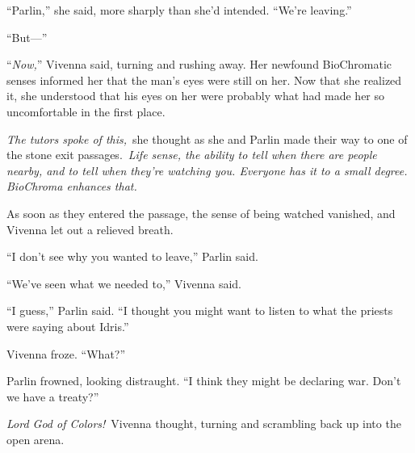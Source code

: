 “Parlin,” she said, more sharply than she’d intended. “We’re leaving.”

“But—”

“\textit{Now,}” Vivenna said, turning and rushing away. Her newfound BioChromatic senses informed her that the man’s eyes were still on her. Now that she realized it, she understood that his eyes on her were probably what had made her so uncomfortable in the first place.

\textit{The tutors spoke of this,}~she thought as she and Parlin made their way to one of the stone exit passages.~\textit{Life sense, the ability to tell when there are people nearby, and to tell when they’re watching you. Everyone has it to a small degree. BioChroma enhances that.}

As soon as they entered the passage, the sense of being watched vanished, and Vivenna let out a relieved breath.

“I don’t see why you wanted to leave,” Parlin said.

“We’ve seen what we needed to,” Vivenna said.

“I guess,” Parlin said. “I thought you might want to listen to what the priests were saying about Idris.”

Vivenna froze. “What?”

Parlin frowned, looking distraught. “I think they might be declaring war. Don’t we have a treaty?”

\textit{Lord God of Colors!}~Vivenna thought, turning and scrambling back up into the open arena.

